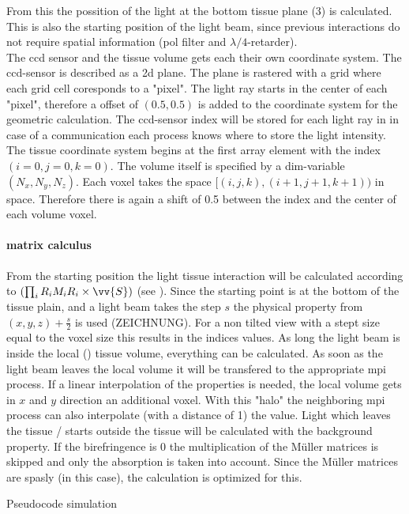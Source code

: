 From this the possition of the light at the bottom tissue plane (3) is calculated.
This is also the starting position of the light beam, since previous interactions do not require spatial information (\ie pol filter and $\lambda/4$-retarder).\\
% 
The ccd sensor and the tissue volume gets each their own coordinate system.
The ccd-sensor is described as a 2d plane.
The plane is rastered with a grid where each grid cell coresponds to a "pixel".
The light ray starts in the center of each "pixel", therefore a offset of $(\num{0.5}, \num{0.5})$ is added to the coordinate system for the geometric calculation.
The ccd-sensor index will be stored for each light ray in in case of a \mpi communication each process knows where to store the light intensity.\\
% 
The tissue coordinate system begins at the first array element with the index $(i=0, j=0, k=0)$.
The volume itself is specified by a dim-variable $(N_x, N_y, N_z)$.
Each voxel takes the space $[(i,j,k),(i+1,j+1,k+1))$ in space.
Therefore there is again a shift of \num{0.5} between the index and the center of each volume voxel.

% 
\paragraph{matrix calculus}
From the starting position the light tissue interaction will be calculated according to $\left( \prod_i R_i M_i R_i \times \vv{S} \right)$ (see \dummy).
Since the starting point is at the bottom of the tissue plain, and a light beam takes the step $s$ the physical property from $(x,y,z) + \frac{s}{2}$ is used (ZEICHNUNG).
For a non tilted view with a stept size equal to the voxel size this results in the indices values.
As long the light beam is inside the local (\mpi) tissue volume, everything can be calculated.
As soon as the light beam leaves the local volume it will be transfered to the appropriate mpi process.
If a linear interpolation of the properties is needed, the local volume gets in $x$ and $y$ direction an additional voxel.
With this "halo" the neighboring mpi process can also interpolate (with a distance of 1) the value.
Light which leaves the tissue / starts outside the tissue will be calculated with the background property.
% 
If the birefringence is 0 the multiplication of the M\"uller matrices is skipped and only the absorption is taken into account.
Since the M\"uller matrices are spasly (in this case), the calculation is optimized for this.
% 
\begin{lstfloat}[!tb]
	
	\caption{Pseudocode simulation}
	\label{alg:simulation}
\end{lstfloat}
%
% 

